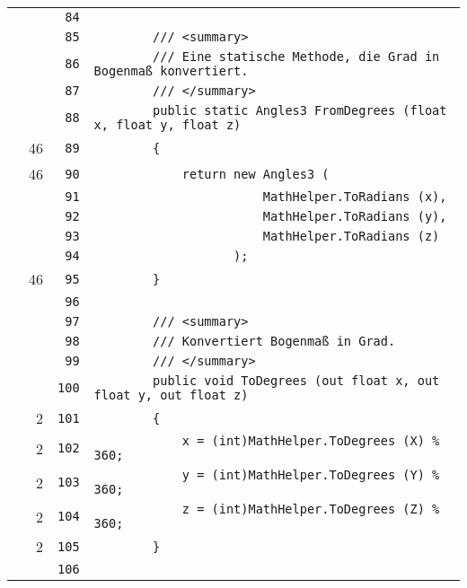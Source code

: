 \documentclass[a4paper,10pt]{article}
\begin{document}
\begin{longtable}[l]{lrrl}
\cellcolor{gray} &  & \verb~84~ & \verb~~\\
\cellcolor{gray} &  & \verb~85~ & \verb~        /// <summary>~\\
\cellcolor{gray} &  & \verb~86~ & \verb~        /// Eine statische Methode, die Grad in Bogenmaß konvertiert.~\\
\cellcolor{gray} &  & \verb~87~ & \verb~        /// </summary>~\\
\cellcolor{gray} &  & \verb~88~ & \verb~        public static Angles3 FromDegrees (float x, float y, float z)~\\
\cellcolor{green} & 46 & \verb~89~ & \verb~        {~\\
\cellcolor{green} & 46 & \verb~90~ & \verb~            return new Angles3 (~\\
\cellcolor{gray} &  & \verb~91~ & \verb~                       MathHelper.ToRadians (x),~\\
\cellcolor{gray} &  & \verb~92~ & \verb~                       MathHelper.ToRadians (y),~\\
\cellcolor{gray} &  & \verb~93~ & \verb~                       MathHelper.ToRadians (z)~\\
\cellcolor{gray} &  & \verb~94~ & \verb~                   );~\\
\cellcolor{green} & 46 & \verb~95~ & \verb~        }~\\
\cellcolor{gray} &  & \verb~96~ & \verb~~\\
\cellcolor{gray} &  & \verb~97~ & \verb~        /// <summary>~\\
\cellcolor{gray} &  & \verb~98~ & \verb~        /// Konvertiert Bogenmaß in Grad.~\\
\cellcolor{gray} &  & \verb~99~ & \verb~        /// </summary>~\\
\cellcolor{gray} &  & \verb~100~ & \verb~        public void ToDegrees (out float x, out float y, out float z)~\\
\cellcolor{green} & 2 & \verb~101~ & \verb~        {~\\
\cellcolor{green} & 2 & \verb~102~ & \verb~            x = (int)MathHelper.ToDegrees (X) % 360;~\\
\cellcolor{green} & 2 & \verb~103~ & \verb~            y = (int)MathHelper.ToDegrees (Y) % 360;~\\
\cellcolor{green} & 2 & \verb~104~ & \verb~            z = (int)MathHelper.ToDegrees (Z) % 360;~\\
\cellcolor{green} & 2 & \verb~105~ & \verb~        }~\\
\cellcolor{gray} &  & \verb~106~ & \verb~~\\

\end{longtable}
\end{document}
